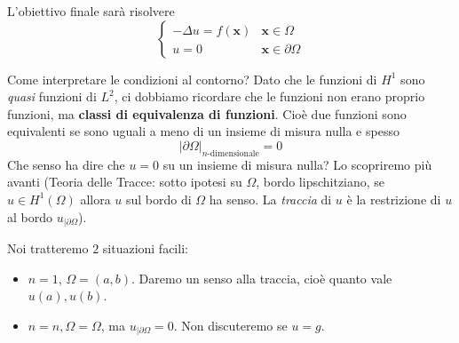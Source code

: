 \documentclass[10pt,a4paper,twoside,openright]{book}
\newcommand{\x}{\mathbf{x}}
\begin{document}
L'obiettivo finale sarà risolvere
\begin{equation*}
    \begin{cases}
        -\Delta u=f(\x) & \x \in \Omega          \\
        u=0             & \x \in \partial \Omega
    \end{cases}
\end{equation*}
\begin{oss}
    Come interpretare le condizioni al contorno? Dato che le funzioni di $H^{1}$ sono \textit{quasi} funzioni di $L^{2}$, ci dobbiamo ricordare che le funzioni non erano proprio funzioni, ma \textbf{classi di equivalenza di funzioni}. Cioè due funzioni sono equivalenti se sono uguali a meno di un insieme di misura nulla e spesso
    \begin{equation*}
        | \partial \Omega | _{n\text{-dimensionale}} =0
    \end{equation*}
    Che senso ha dire che $u=0$ su un insieme di misura nulla? Lo scopriremo più avanti (Teoria delle Tracce: sotto ipotesi su $\Omega $, bordo lipschitziano, se $u\in H^{1}(\Omega)$ allora $u$ sul bordo di $\Omega $ ha senso. La \textit{traccia} di $u$ è la restrizione di $u$ al bordo $u_{|\partial \Omega }$).
\end{oss}
Noi tratteremo $2$ situazioni facili:
\begin{itemize}
    \item $n=1$, $\Omega =(a,b)$. Daremo un senso alla traccia, cioè quanto vale $u(a) ,u(b)$.
    \item $n=n,\Omega =\Omega $, ma $u_{|\partial \Omega } =0$. Non discuteremo se $u=g$.
\end{itemize}
\end{document}
